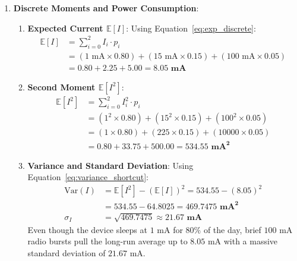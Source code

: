 \begin{enumerate}
    \item \textbf{Discrete Moments and Power Consumption}:
    \begin{enumerate}[label=(\alph*)]
        \item \textbf{Expected Current $\mathbb{E}[I]$}:
        Using Equation~\eqref{eq:exp_discrete}:
        \begin{align*}
        \mathbb{E}[I] &= \sum_{i=0}^{2} I_i \cdot p_i \\
        &= (1\text{ mA} \times 0.80) + (15\text{ mA} \times 0.15) + (100\text{ mA} \times 0.05) \\
        &= 0.80 + 2.25 + 5.00 = \mathbf{8.05\text{ mA}}
        \end{align*}
        \item \textbf{Second Moment $\mathbb{E}[I^2]$}:
        \begin{align*}
        \mathbb{E}[I^2] &= \sum_{i=0}^{2} I_i^2 \cdot p_i \\
        &= (1^2 \times 0.80) + (15^2 \times 0.15) + (100^2 \times 0.05) \\
        &= (1 \times 0.80) + (225 \times 0.15) + (10000 \times 0.05) \\
        &= 0.80 + 33.75 + 500.00 = \mathbf{534.55\text{ mA}^2}
        \end{align*}
        \item \textbf{Variance and Standard Deviation}:
        Using Equation~\eqref{eq:variance_shortcut}:
        \begin{align*}
        \text{Var}(I) &= \mathbb{E}[I^2] - (\mathbb{E}[I])^2 = 534.55 - (8.05)^2 \\
        &= 534.55 - 64.8025 = \mathbf{469.7475\text{ mA}^2} \\
        \sigma_I &= \sqrt{469.7475} \approx \mathbf{21.67\text{ mA}}
        \end{align*}
        Even though the device sleeps at $1\text{ mA}$ for $80\%$ of the day, brief $100\text{ mA}$ radio bursts pull the long-run average up to $8.05\text{ mA}$ with a massive standard deviation of $21.67\text{ mA}$.
    \end{enumerate}


\end{enumerate}
